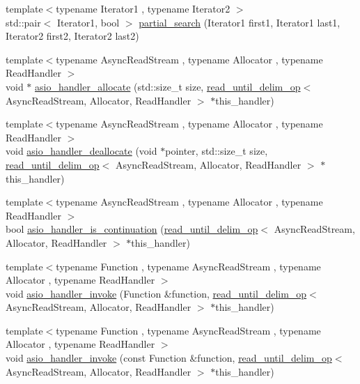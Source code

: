 \begin{DoxyCompactItemize}
\item 
{\footnotesize template$<$typename Iterator1 , typename Iterator2 $>$ }\\std\+::pair$<$ Iterator1, bool $>$ \hyperlink{namespaceasio_1_1detail_a6c813c9bb4241b1e7c32ad61808e4f30}{partial\+\_\+search} (Iterator1 first1, Iterator1 last1, Iterator2 first2, Iterator2 last2)
\item 
{\footnotesize template$<$typename Async\+Read\+Stream , typename Allocator , typename Read\+Handler $>$ }\\void $\ast$ \hyperlink{namespaceasio_1_1detail_aa4d4deea43c07e1a1dde2021e2a05ea6}{asio\+\_\+handler\+\_\+allocate} (std\+::size\+\_\+t size, \hyperlink{classasio_1_1detail_1_1read__until__delim__op}{read\+\_\+until\+\_\+delim\+\_\+op}$<$ Async\+Read\+Stream, Allocator, Read\+Handler $>$ $\ast$this\+\_\+handler)
\item 
{\footnotesize template$<$typename Async\+Read\+Stream , typename Allocator , typename Read\+Handler $>$ }\\void \hyperlink{namespaceasio_1_1detail_a5b0c0bb7269c3dd32077a4f742bba3ed}{asio\+\_\+handler\+\_\+deallocate} (void $\ast$pointer, std\+::size\+\_\+t size, \hyperlink{classasio_1_1detail_1_1read__until__delim__op}{read\+\_\+until\+\_\+delim\+\_\+op}$<$ Async\+Read\+Stream, Allocator, Read\+Handler $>$ $\ast$this\+\_\+handler)
\item 
{\footnotesize template$<$typename Async\+Read\+Stream , typename Allocator , typename Read\+Handler $>$ }\\bool \hyperlink{namespaceasio_1_1detail_a50ac31f01eb0e0532b92c372d5f42faf}{asio\+\_\+handler\+\_\+is\+\_\+continuation} (\hyperlink{classasio_1_1detail_1_1read__until__delim__op}{read\+\_\+until\+\_\+delim\+\_\+op}$<$ Async\+Read\+Stream, Allocator, Read\+Handler $>$ $\ast$this\+\_\+handler)
\item 
{\footnotesize template$<$typename Function , typename Async\+Read\+Stream , typename Allocator , typename Read\+Handler $>$ }\\void \hyperlink{namespaceasio_1_1detail_a1eb1ad851e7786b07f870b46bb2b5c02}{asio\+\_\+handler\+\_\+invoke} (Function \&function, \hyperlink{classasio_1_1detail_1_1read__until__delim__op}{read\+\_\+until\+\_\+delim\+\_\+op}$<$ Async\+Read\+Stream, Allocator, Read\+Handler $>$ $\ast$this\+\_\+handler)
\item 
{\footnotesize template$<$typename Function , typename Async\+Read\+Stream , typename Allocator , typename Read\+Handler $>$ }\\void \hyperlink{namespaceasio_1_1detail_aa13a6b319243ff935e4c644e90441cee}{asio\+\_\+handler\+\_\+invoke} (const Function \&function, \hyperlink{classasio_1_1detail_1_1read__until__delim__op}{read\+\_\+until\+\_\+delim\+\_\+op}$<$ Async\+Read\+Stream, Allocator, Read\+Handler $>$ $\ast$this\+\_\+handler)

\end{DoxyCompactItemize}

